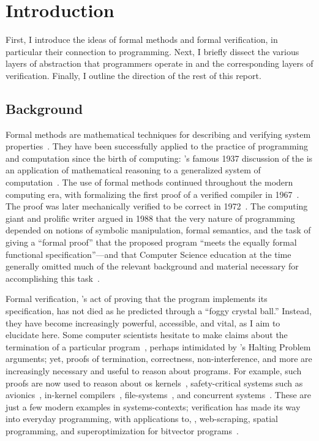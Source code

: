 \section{Introduction}

First, I introduce the ideas of formal methods and formal verification, in
particular their connection to programming. Next, I briefly dissect the various
layers of abstraction that programmers operate in and the corresponding
layers of verification. Finally, I outline the direction of the rest of this
report.

\subsection{Background}\label{S:background}

Formal methods are mathematical techniques for describing and verifying system
properties~\cite{Wing_90}. They have been successfully applied to the practice
of programming and computation since the birth of computing:
\citeauthor{Turing_1937}'s famous 1937 discussion of the {\haltprob} is an
application of mathematical reasoning to a generalized system of
computation~\cite{Turing_1937}. The use of formal methods continued throughout
the modern computing era, with \citeauthor{McCarthy_67} formalizing the first
proof of a verified compiler in 1967~\cite{McCarthy_67}. The proof was later
mechanically verified to be correct in 1972~\cite{Milner_72}. The computing
giant and prolific writer \citeauthor{EWD:EWD1036} argued in 1988 that the very
nature of programming depended on notions of symbolic manipulation, formal
semantics, and the task of giving a ``formal proof'' that the proposed program
``meets the equally formal functional specification''---and that Computer
Science education at the time generally omitted much of the relevant background
and material necessary for accomplishing this task~\cite{EWD:EWD1036}.

Formal verification, \citeauthor{EWD:EWD1036}'s act of proving that the program
implements its specification, has not died as he predicted through a ``foggy
crystal ball.'' Instead, they have become increasingly powerful, accessible, and
vital, as I aim to elucidate here. Some computer scientists hesitate to make
claims about the termination of a particular program~\cite{Cook_2011}, perhaps
intimidated by \citeauthor{Turing_1937}'s Halting Problem arguments; yet, proofs
of termination, correctness, non-interference, and more are increasingly
necessary and useful to reason about programs. For example, such proofs are now
used to reason about \gls{os}
kernels~\cite{Klein_EHACDEEKNSTW_09,Klein_AEHCDEEKNSTW_10,Klein_AEMSKH_14,Sewell_KH_16,Narayanan_2019,Narayan_2020,Nelson_2017},
safety-critical systems such as avionics~\cite[\S 1]{Leroy-Compcert-CACM},
in-kernel compilers~\cite{186144,258848}, file-systems~\cite{Zou_2019}, and
concurrent systems~\cite{222565,222621}. These are just a few modern examples in
systems-contexts; verification has made its way into everyday programming, with
applications to, \eg, web-scraping, spatial programming, and superoptimization
for bitvector programs~\cite[\S 4]{Torlak_2013}.

